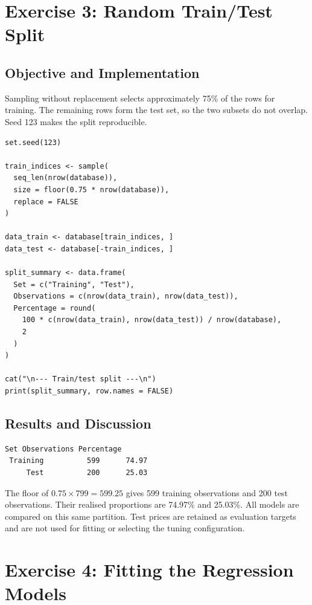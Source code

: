 \documentclass[11pt,a4paper]{article}
\begin{document}
\section{Exercise 3: Random Train/Test Split}
\subsection{Objective and Implementation}
Sampling without replacement selects approximately 75\% of the rows for training. The remaining rows form the test set, so the two subsets do not overlap. Seed 123 makes the split reproducible.
\begin{lstlisting}
set.seed(123)

train_indices <- sample(
  seq_len(nrow(database)),
  size = floor(0.75 * nrow(database)),
  replace = FALSE
)

data_train <- database[train_indices, ]
data_test <- database[-train_indices, ]

split_summary <- data.frame(
  Set = c("Training", "Test"),
  Observations = c(nrow(data_train), nrow(data_test)),
  Percentage = round(
    100 * c(nrow(data_train), nrow(data_test)) / nrow(database),
    2
  )
)

cat("\n--- Train/test split ---\n")
print(split_summary, row.names = FALSE)
\end{lstlisting}

\subsection{Results and Discussion}
\par\noindent\begin{minipage}{\linewidth}
\begin{lstlisting}[style=console]
Set Observations Percentage
 Training          599      74.97
     Test          200      25.03
\end{lstlisting}
\end{minipage}\par
The floor of $0.75\times799=599.25$ gives 599 training observations and 200 test observations. Their realised proportions are 74.97\% and 25.03\%. All models are compared on this same partition. Test prices are retained as evaluation targets and are not used for fitting or selecting the tuning configuration.

\section{Exercise 4: Fitting the Regression Models}
\end{document}
